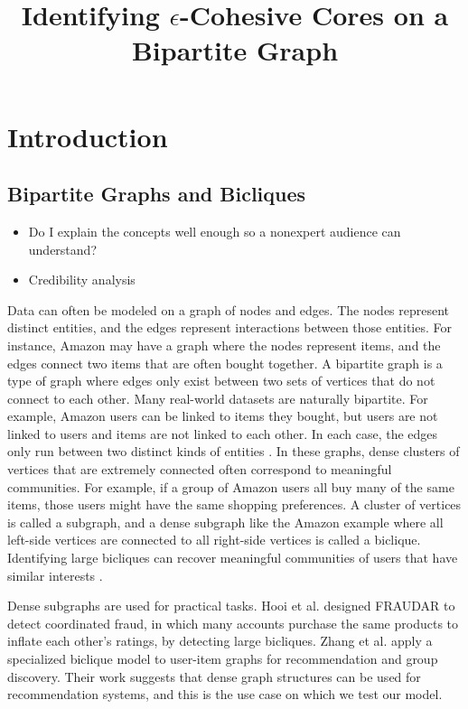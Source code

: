 \documentclass[conference]{IEEEtran}
\title{Identifying $\epsilon$-Cohesive Cores on a Bipartite Graph}
\author{
\IEEEauthorblockN{Kiyaan Pillai}
}
\begin{document}
\maketitle

\section{Introduction}
\subsection{Bipartite Graphs and Bicliques}

\begin{itemize}
\item Do I explain the concepts well enough so a nonexpert audience can understand?
\item Credibility analysis
\end{itemize}



Data can often be modeled on a graph of nodes and edges. The nodes represent distinct entities, and the edges represent interactions between those entities. For instance, Amazon may have a graph where the nodes represent items, and the edges connect two items that are often bought together. A bipartite graph is a type of graph where edges only exist between two sets of vertices that do not connect to each other. Many real-world datasets are naturally bipartite. For example, Amazon users can be linked to items they bought, but users are not linked to users and items are not linked to each other. In each case, the edges only run between two distinct kinds of entities \cite{zhang2025density}. In these graphs, dense clusters of vertices that are extremely connected often correspond to meaningful communities. For example, if a group of Amazon users all buy many of the same items, those users might have the same shopping preferences. A cluster of vertices is called a subgraph, and a dense subgraph like the Amazon example where all left-side vertices are connected to all right-side vertices is called a biclique. Identifying large bicliques can recover meaningful communities of users that have similar interests \cite{lehmann2008biclique, alzahrani2019finding}.



Dense subgraphs are used for practical tasks. Hooi et al. \cite{hooi2017graph} designed FRAUDAR to detect coordinated fraud, in which many accounts purchase the same products to inflate each other's ratings, by detecting large bicliques. Zhang et al. \cite{zhang2025cohesive} apply a specialized biclique model to user-item graphs for recommendation and group discovery. Their work suggests that dense graph structures can be used for recommendation systems, and this is the use case on which we test our model.
\end{document}
